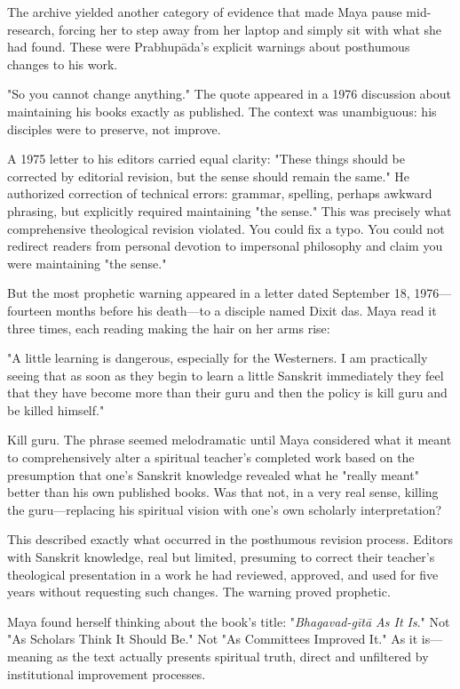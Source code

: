 \documentclass[12pt,twoside]{book}
\begin{document}
The archive yielded another category of evidence that made Maya pause mid-research, forcing her to step away from her laptop and simply sit with what she had found. These were Prabhupāda's explicit warnings about posthumous changes to his work.

"So you cannot change anything." The quote appeared in a 1976 discussion about maintaining his books exactly as published. The context was unambiguous: his disciples were to preserve, not improve.

A 1975 letter to his editors carried equal clarity: "These things should be corrected by editorial revision, but the sense should remain the same." He authorized correction of technical errors: grammar, spelling, perhaps awkward phrasing, but explicitly required maintaining "the sense." This was precisely what comprehensive theological revision violated. You could fix a typo. You could not redirect readers from personal devotion to impersonal philosophy and claim you were maintaining "the sense."

But the most prophetic warning appeared in a letter dated September 18, 1976—fourteen months before his death—to a disciple named Dixit das. Maya read it three times, each reading making the hair on her arms rise:

"A little learning is dangerous, especially for the Westerners. I am practically seeing that as soon as they begin to learn a little Sanskrit immediately they feel that they have become more than their guru and then the policy is kill guru and be killed himself."

Kill guru. The phrase seemed melodramatic until Maya considered what it meant to comprehensively alter a spiritual teacher's completed work based on the presumption that one's Sanskrit knowledge revealed what he "really meant" better than his own published books. Was that not, in a very real sense, killing the guru—replacing his spiritual vision with one's own scholarly interpretation?

This described exactly what occurred in the posthumous revision process. Editors with Sanskrit knowledge, real but limited, presuming to correct their teacher's theological presentation in a work he had reviewed, approved, and used for five years without requesting such changes. The warning proved prophetic.

Maya found herself thinking about the book's title: "\emph{Bhagavad-gītā As It Is}." Not "As Scholars Think It Should Be." Not "As Committees Improved It." As it is—meaning as the text actually presents spiritual truth, direct and unfiltered by institutional improvement processes.
\end{document}

